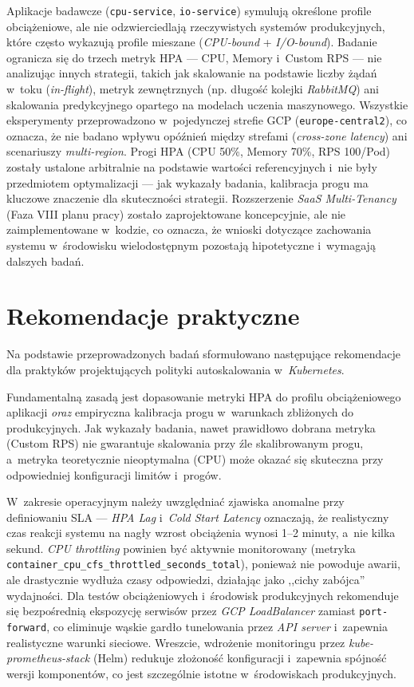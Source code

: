 Aplikacje badawcze (\texttt{cpu-service}, \texttt{io-service}) symulują określone profile obciążeniowe, ale nie odzwierciedlają rzeczywistych systemów produkcyjnych, które często wykazują profile mieszane (\textit{CPU-bound} + \textit{I/O-bound}). Badanie ogranicza się do trzech metryk HPA — CPU, Memory i~Custom RPS — nie analizując innych strategii, takich jak skalowanie na podstawie liczby żądań w~toku (\textit{in-flight}), metryk zewnętrznych (np. długość kolejki \textit{RabbitMQ}) ani skalowania predykcyjnego opartego na modelach uczenia maszynowego. Wszystkie eksperymenty przeprowadzono w~pojedynczej strefie GCP (\texttt{europe-central2}), co oznacza, że nie badano wpływu opóźnień między strefami (\textit{cross-zone latency}) ani scenariuszy \textit{multi-region}. Progi HPA (CPU 50\%, Memory 70\%, RPS 100/Pod) zostały ustalone arbitralnie na podstawie wartości referencyjnych i~nie były przedmiotem optymalizacji — jak wykazały badania, kalibracja progu ma kluczowe znaczenie dla skuteczności strategii. Rozszerzenie \textit{SaaS Multi-Tenancy} (Faza VIII planu pracy) zostało zaprojektowane koncepcyjnie, ale nie zaimplementowane w~kodzie, co oznacza, że wnioski dotyczące zachowania systemu w~środowisku wielodostępnym pozostają hipotetyczne i~wymagają dalszych badań.

\section{Rekomendacje praktyczne}

Na podstawie przeprowadzonych badań sformułowano następujące rekomendacje dla praktyków projektujących polityki autoskalowania w~\textit{Kubernetes}.

Fundamentalną zasadą jest dopasowanie metryki HPA do profilu obciążeniowego aplikacji \textit{oraz} empiryczna kalibracja progu w~warunkach zbliżonych do produkcyjnych. Jak wykazały badania, nawet prawidłowo dobrana metryka (Custom RPS) nie gwarantuje skalowania przy źle skalibrowanym progu, a~metryka teoretycznie nieoptymalna (CPU) może okazać się skuteczna przy odpowiedniej konfiguracji limitów i~progów.

W~zakresie operacyjnym należy uwzględniać zjawiska anomalne przy definiowaniu SLA — \textit{HPA Lag} i~\textit{Cold Start Latency} oznaczają, że realistyczny czas reakcji systemu na nagły wzrost obciążenia wynosi 1--2 minuty, a~nie kilka sekund. \textit{CPU throttling} powinien być aktywnie monitorowany (metryka \texttt{container\_cpu\_cfs\_throttled\_seconds\_total}), ponieważ nie powoduje awarii, ale drastycznie wydłuża czasy odpowiedzi, działając jako ,,cichy zabójca'' wydajności. Dla testów obciążeniowych i~środowisk produkcyjnych rekomenduje się bezpośrednią ekspozycję serwisów przez \textit{GCP LoadBalancer} zamiast \texttt{port-forward}, co eliminuje wąskie gardło tunelowania przez \textit{API server} i~zapewnia realistyczne warunki sieciowe. Wreszcie, wdrożenie monitoringu przez \textit{kube-prometheus-stack} (Helm) redukuje złożoność konfiguracji i~zapewnia spójność wersji komponentów, co jest szczególnie istotne w~środowiskach produkcyjnych.

